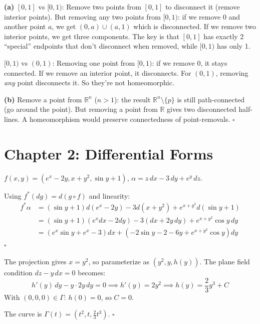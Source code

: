 \documentclass[11pt, letterpaper, openany]{book}
\newenvironment{solution}[1][Solution]{%
  \tcolorbox[blanker, breakable, left=1em,
    before skip=1em, after skip=1em,
    borderline west={2pt}{0pt}{MagicBlue},
    colback=MagicCream,
    before upper={\textcolor{MagicBlue}{\sffamily\bfseries #1.}\space}
  ]%
}{%
  \hfill\textcolor{MagicBlue}{\ensuremath{\square}}\endtcolorbox%
}
\begin{document}
\begin{solution}[1.7]
\textbf{(a)} $[0,1]$ vs $[0,1)$: Remove two points from $[0,1]$ to disconnect it (remove interior points). But removing any two points from $[0,1)$: if we remove $0$ and another point $a$, we get $(0, a) \cup (a, 1)$ which is disconnected. If we remove two interior points, we get three components. The key is that $[0,1]$ has exactly 2 ``special'' endpoints that don't disconnect when removed, while $[0,1)$ has only 1.

$[0,1)$ vs $(0,1)$: Removing one point from $[0,1)$: if we remove $0$, it stays connected. If we remove an interior point, it disconnects. For $(0,1)$, removing \emph{any} point disconnects it. So they're not homeomorphic.

\textbf{(b)} Remove a point from $\mathbb{R}^n$ ($n > 1$): the result $\mathbb{R}^n \setminus \{p\}$ is still path-connected (go around the point). But removing a point from $\mathbb{R}$ gives two disconnected half-lines. A homeomorphism would preserve connectedness of point-removals.
\end{solution}

\section*{Chapter 2: Differential Forms}

\begin{solution}[2.1]
$f(x,y) = (e^x - 2y, x + y^2, \sin y + 1)$, $\alpha = z\,dx - 3\,dy + e^y\,dz$.

Using $f^*(dg) = d(g \circ f)$ and linearity:
\begin{align*}
f^*\alpha &= (\sin y + 1)d(e^x - 2y) - 3d(x + y^2) + e^{x+y^2}d(\sin y + 1) \\
&= (\sin y + 1)(e^x dx - 2dy) - 3(dx + 2y\,dy) + e^{x+y^2}\cos y\,dy \\
&= (e^x\sin y + e^x - 3)dx + (-2\sin y - 2 - 6y + e^{x+y^2}\cos y)dy
\end{align*}
\end{solution}

\begin{solution}[2.3]
The projection gives $x = y^2$, so parameterize as $(y^2, y, h(y))$. The plane field condition $dz - y\,dx = 0$ becomes:
\[
h'(y)\,dy - y \cdot 2y\,dy = 0 \implies h'(y) = 2y^2 \implies h(y) = \frac{2}{3}y^3 + C
\]
With $(0,0,0) \in \Gamma$: $h(0) = 0$, so $C = 0$.

The curve is $\Gamma(t) = (t^2, t, \frac{2}{3}t^3)$.
\end{solution}
\end{document}
